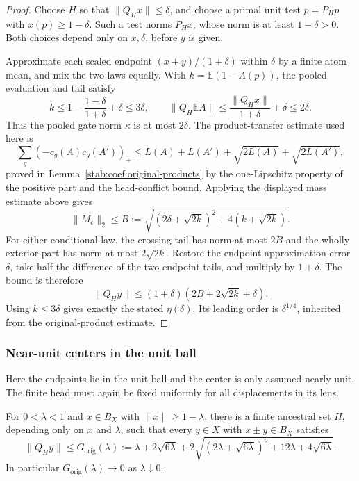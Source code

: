 \begin{proof}
Choose \(H\) so that \(\|Q_Hx\|\le\delta\), and choose a primal
unit test \(p=P_Hp\) with \(x(p)\ge1-\delta\). Such a test norms
\(P_Hx\), whose norm is at least \(1-\delta>0\).
Both choices depend only on \(x,\delta\), before \(y\) is given.

Approximate each scaled endpoint \((x\pm y)/(1+\delta)\) within
\(\delta\) by a finite atom mean, and mix the two laws equally.
With \(k=\mathbb E(1-A(p))\), the pooled evaluation and tail satisfy
\[
 k\le1-\frac{1-\delta}{1+\delta}+\delta\le3\delta,
 \qquad
 \|Q_H\mathbb EA\|\le\frac{\|Q_Hx\|}{1+\delta}+\delta
 \le2\delta.
\]
Thus the pooled gate norm \(\kappa\) is at most \(2\delta\).
The product-transfer estimate used here is
\begin{equation}\label{molb:eq:original-products}
 \sum_g(-c_g(A)c_g(A'))_+
 \le L(A)+L(A')+\sqrt{2L(A)}+\sqrt{2L(A')},
\end{equation}
proved in Lemma~\ref{stab:coef:original-products} by the
one-Lipschitz property of the positive part and the head-conflict bound.
Applying the displayed mass estimate above gives
\[
 \|M_c\|_2\le
 B:=\sqrt{(2\delta+\sqrt{2k})^2+4(k+\sqrt{2k})}.
\]
For either conditional law, the crossing tail has norm at most \(2B\)
and the wholly exterior part has norm at most \(2\sqrt{2k}\).
Restore the endpoint approximation error \(\delta\), take half the
difference of the two endpoint tails, and multiply by \(1+\delta\).
The bound is therefore
\[
 \|Q_Hy\|\le(1+\delta)(2B+2\sqrt{2k}+\delta).
\]
Using \(k\le3\delta\) gives exactly the stated \(\eta(\delta)\).
Its leading order is \(\delta^{1/4}\), inherited from the
original-product estimate.
\end{proof}

\subsubsection{Near-unit centers in the unit ball}
\label{molx:actual-center-section}

Here the endpoints lie in the unit ball and the center is only
assumed nearly unit. The finite head must again be fixed uniformly for
all displacements in its lens.

\begin{proposition}\label{molx:actual-center-fourth}
For $0<\lambda<1$ and $x\in B_X$ with $\|x\|\ge1-\lambda$,
there is a finite ancestral set $H$, depending only on $x$ and
$\lambda$, such that every $y\in X$ with $x\pm y\in B_X$ satisfies
\begin{equation}\label{molx:actual-center-fourth-bound}
 \|Q_Hy\|\le G_{\mathrm{orig}}(\lambda)
 :=\lambda+2\sqrt{6\lambda}
 +2\sqrt{(2\lambda+\sqrt{6\lambda})^2
                  +12\lambda+4\sqrt{6\lambda}}.
\end{equation}
In particular $G_{\mathrm{orig}}(\lambda)\to0$ as $\lambda\downarrow0$.
\end{proposition}

